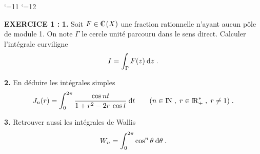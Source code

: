 \documentclass{article}
\begin{document}
\def\boxit#1#2{\setbox1=\hbox{\kern#1{#2}\kern#1}%
\dimen1=\ht1 \advance\dimen1 by #1 \dimen2=\dp1 \advance\dimen2 by #1
\setbox1=\hbox{\vrule height\dimen1 depth\dimen2\box1\vrule}%
\setbox1=\vbox{\hrule\box1\hrule}%
\advance\dimen1 by .4pt \ht1=\dimen1
\advance\dimen2 by .4pt \dp1=\dimen2 \box1\relax}


\catcode`\@=11
\def\system#1{\left\{\null\,\vcenter{\openup1\jot\m@th
\ialign{\strut\hfil$##$&$##$\hfil&&\enspace$##$\enspace&
\hfil$##$&$##$\hfil\crcr#1\crcr}}\right.}
\catcode`\@=12
\pagestyle{empty}
\def\lap#1{{\cal L}[#1]}
\def\DP#1#2{{\partial#1\s\partial#2}}
\def\cala{{\cal A}}
\def\fhat{\widehat{f}}
\let\wh=\widehat
\def\ftilde{\tilde{f}}











\def\lap#1{{\cal L}[#1]}
\def\DP#1#2{{\partial#1\s\partial#2}}



\overfullrule=0mm


\msk
{}\msk
{}
\bsk

{\bf EXERCICE 1 :}\msk
{\bf 1.} Soit $F\in\cmat(X)$ une fraction rationnelle n'ayant aucun p\^ole de module 1. On note $\Gamma$ le cercle unit\'e parcouru dans le sens direct. Calculer l'int\'egrale curviligne\vv
$$I=\int_{\Gamma}F(z)\>{\rm d}z\;.$$\par
{\bf 2.} En d\'eduire les int\'egrales simples\vv
$$J_n(r)=\int_0^{2\pi}{\cos nt\over1+r^2-2r\>\cos t}\>{\rm d}t\qquad(n\in{\rm I\kern-0.5mm N}\;,\;r\in{\rm I\kern-0.6mm R}_+^*\;,\;r\not=1)\;.$$\par
{\bf 3.} Retrouver aussi les int\'egrales de Wallis\vv
$$W_n=\int_0^{2\pi}\cos^n\theta\>{\rm d}\theta\;.$$
\end{document}
